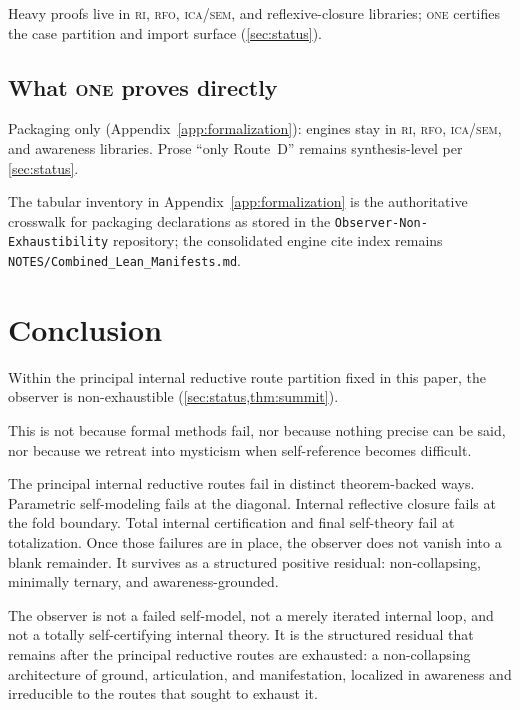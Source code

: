 \documentclass[11pt]{article}
\theoremstyle{plain}
\theoremstyle{definition}
\theoremstyle{remark}
\newcommand{\ONE}{\textsc{one}}
\newcommand{\RI}{\textsc{ri}}
\newcommand{\RFO}{\textsc{rfo}}
\newcommand{\ICA}{\textsc{ica}}
\newcommand{\SEM}{\textsc{sem}}
\begin{document}
\begin{keybox}[title={Engines vs \ONE{} packaging}]
Heavy proofs live in \RI, \RFO, \ICA/\SEM, and reflexive-closure libraries;
\ONE{} certifies the case partition and import surface (\cref{sec:status}).
\end{keybox}

\subsection*{What \ONE{} proves directly}

Packaging only (Appendix~\ref{app:formalization}): engines stay in \RI,
\RFO, \ICA/\SEM, and awareness libraries.  Prose ``only Route~D'' remains
synthesis-level per \cref{sec:status}.

\medskip
\noindent
The tabular inventory in Appendix~\ref{app:formalization} is the
authoritative crosswalk for packaging declarations as stored in the
\texttt{Observer-Non-Exhaustibility} repository; the consolidated engine
cite index remains \texttt{NOTES/Combined\_Lean\_Manifests.md}.

\section{Conclusion}
\label{sec:conclusion}

Within the principal internal reductive route partition fixed in this
paper, the observer is non-exhaustible (\cref{sec:status,thm:summit}).

This is not because formal methods fail, nor because nothing precise can
be said, nor because we retreat into mysticism when self-reference becomes
difficult.

The principal internal reductive routes fail in distinct theorem-backed
ways.  Parametric self-modeling fails at the diagonal.  Internal
reflective closure fails at the fold boundary.  Total internal
certification and final self-theory fail at totalization.  Once those
failures are in place, the observer does not vanish into a blank
remainder.  It survives as a structured positive residual: non-collapsing,
minimally ternary, and awareness-grounded.

\begin{keybox}[title={Final picture}]
The observer is not a failed self-model, not a merely iterated internal
loop, and not a totally self-certifying internal theory.  It is the
structured residual that remains after the principal reductive routes are
exhausted: a non-collapsing architecture of ground, articulation, and
manifestation, localized in awareness and irreducible to the routes that
sought to exhaust it.
\end{keybox}
\end{document}
